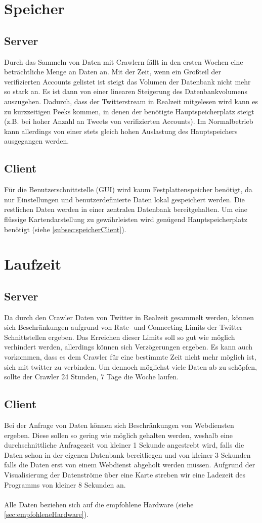 \section{Speicher}
\subsection{Server}
Durch das Sammeln von Daten mit Crawlern fällt in den ersten Wochen eine beträchtliche Menge an Daten an. Mit der Zeit, wenn ein Großteil der verifizierten Accounts gelistet ist steigt das Volumen der Datenbank nicht mehr so stark an. Es ist dann von einer linearen Steigerung des Datenbankvolumens auszugehen. 
Dadurch, dass der Twitterstream in Realzeit mitgelesen wird kann es zu  kurzzeitigen Peeks kommen, in denen der benötigte Hauptspeicherplatz steigt (z.B. bei hoher Anzahl an Tweets von verifizierten Accounts). Im Normalbetrieb kann allerdings von einer stets gleich hohen Auslastung des Hauptspeichers ausgegangen werden.
\subsection{Client}
Für die Benutzerschnittstelle (GUI) wird kaum Festplattenspeicher benötigt, da nur Einstellungen und benutzerdefinierte Daten lokal gespeichert werden. Die restlichen Daten werden in einer zentralen Datenbank bereitgehalten.
Um eine flüssige Kartendarstellung zu gewährleisten wird genügend Hauptspeicherplatz benötigt (siehe \ref{subsec:speicherClient}).
\section{Laufzeit}
\subsection{Server}
Da durch den Crawler Daten von Twitter in Realzeit gesammelt werden, können sich Beschränkungen aufgrund von Rate- und Connecting-Limits der Twitter Schnittstellen ergeben. Das Erreichen dieser Limits soll so gut wie möglich verhindert werden, allerdings können sich Verzögerungen ergeben. Es kann auch vorkommen, dass es dem Crawler für eine bestimmte Zeit nicht mehr möglich ist, sich mit twitter zu verbinden. Um dennoch möglichst viele Daten ab zu schöpfen, sollte der Crawler 24 Stunden, 7 Tage die Woche laufen.
\subsection{Client}
Bei der Anfrage von Daten können sich Beschränkungen von Webdiensten ergeben. Diese sollen so gering wie möglich gehalten werden, weshalb eine durchschnittliche Anfragezeit von kleiner 1 Sekunde angestrebt wird, falls die Daten schon in der eigenen Datenbank bereitliegen und von kleiner 3 Sekunden falls die Daten erst von einem Webdienst abgeholt werden müssen.
Aufgrund der Visualisierung der Datenströme über eine Karte streben wir eine Ladezeit des Programms von kleiner 8 Sekunden an.\\\\
Alle Daten beziehen sich auf die empfohlene Hardware (siehe \ref{sec:empfohleneHardware}).